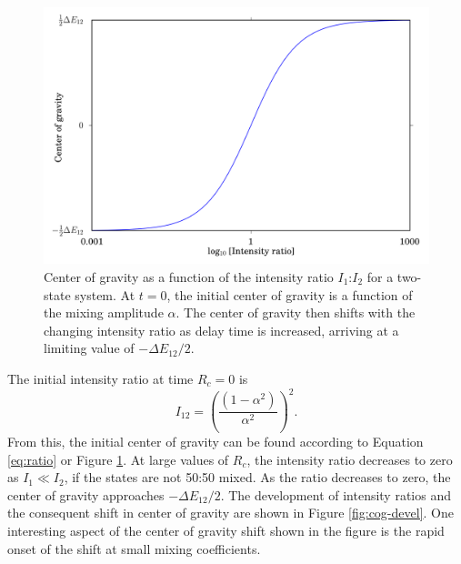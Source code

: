 \documentclass[12pt]{mitthesis}
\begin{document}
\begin{figure}
  \caption{Center of gravity as a function of the intensity ratio
    $I_1$:$I_2$ for a two-state system.  At $t=0$, the initial center
    of gravity is a function of the mixing amplitude $\alpha$.  The
    center of gravity then shifts with the changing intensity ratio as
    delay time is increased, arriving at a limiting value of $-\Delta
    E_{12}/2$.}
  \label{fig:ratio}
  \centering
  \includegraphics[width=6in]{cog-from-ratio.png}
\end{figure}

The initial intensity ratio at time $R_c=0$ is
\begin{equation}
  I_{12} = 
  \left(
    \frac{(1 - \alpha^2)}{\alpha^2}
  \right)^2.
\end{equation}
From this, the initial center of gravity can be found according to
Equation \ref{eq:ratio} or Figure \ref{fig:ratio}.  At large values of
$R_c$, the intensity ratio decreases to zero as $I_1 \ll I_2$, if the
states are not 50:50 mixed.  As the ratio decreases to zero, the
center of gravity approaches $-\Delta E_{12} / 2$.  The development of
intensity ratios and the consequent shift in center of gravity are
shown in Figure \ref{fig:cog-devel}.  One interesting aspect of the
center of gravity shift shown in the figure is the rapid onset of the
shift at small mixing coefficients.
\end{document}
